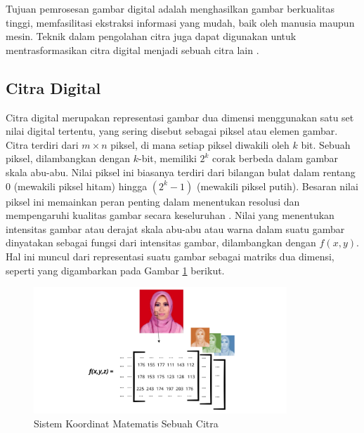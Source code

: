     

    Tujuan pemrosesan gambar digital adalah menghasilkan gambar berkualitas tinggi, memfasilitasi ekstraksi informasi yang mudah, baik oleh manusia maupun mesin.
    Teknik dalam pengolahan citra juga dapat digunakan untuk mentrasformasikan citra digital menjadi sebuah citra lain \cite{Kirana2021}.  

\subsection{Citra Digital}

    Citra digital merupakan representasi gambar dua dimensi menggunakan satu set nilai digital tertentu, yang sering disebut sebagai piksel atau elemen gambar. Citra terdiri dari $m \times n$ piksel, di mana setiap piksel diwakili oleh $k$ bit. Sebuah piksel, dilambangkan dengan $k$-bit, memiliki $2^k$ corak berbeda dalam gambar skala abu-abu. Nilai piksel ini biasanya terdiri dari bilangan bulat dalam rentang 0 (mewakili piksel hitam) hingga $(2^k - 1)$ (mewakili piksel putih). Besaran nilai piksel ini memainkan peran penting dalam menentukan resolusi dan mempengaruhi kualitas gambar secara keseluruhan \cite{book}. Nilai yang menentukan intensitas gambar atau derajat skala abu-abu atau warna dalam suatu gambar dinyatakan sebagai fungsi dari intensitas gambar, dilambangkan dengan $f(x, y)$. Hal ini muncul dari representasi suatu gambar sebagai matriks dua dimensi, seperti yang digambarkan pada Gambar \ref{Sistem Koordinat Matematis Sebuah Citra} \cite{Andono2018} berikut.

    \begin{figure}[H]
      \centering
      \includegraphics[width=0.85\textwidth]{figures/bab2/citra_digital.png}
      \caption{Sistem Koordinat Matematis Sebuah Citra \cite{Kirana2021}}
      \label{Sistem Koordinat Matematis Sebuah Citra}
    \end{figure}




